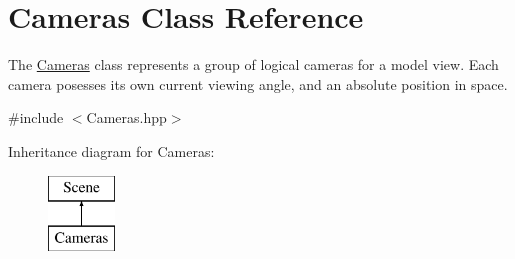 \hypertarget{class_cameras}{\section{Cameras Class Reference}
\label{class_cameras}
}


The \hyperlink{class_cameras}{Cameras} class represents a group of logical cameras for a model view. Each camera posesses its own current viewing angle, and an absolute position in space.  




{\ttfamily \#include $<$Cameras.\-hpp$>$}

Inheritance diagram for Cameras\-:\begin{figure}[H]
\begin{center}
\leavevmode
\includegraphics[height=2.000000cm]{class_cameras}
\end{center}
\end{figure}
